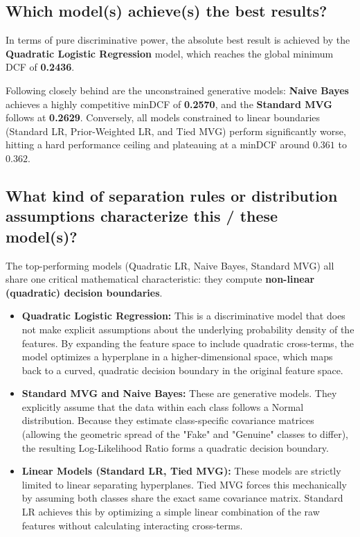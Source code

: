 \subsection*{Which model(s) achieve(s) the best results?}

In terms of pure discriminative power, the absolute best result is achieved by the \textbf{Quadratic Logistic Regression} model, which reaches the global minimum DCF of \textbf{0.2436}. 

Following closely behind are the unconstrained generative models: \textbf{Naive Bayes} achieves a highly competitive minDCF of \textbf{0.2570}, and the \textbf{Standard MVG} follows at \textbf{0.2629}. Conversely, all models constrained to linear boundaries (Standard LR, Prior-Weighted LR, and Tied MVG) perform significantly worse, hitting a hard performance ceiling and plateauing at a minDCF around $0.361$ to $0.362$.

\subsection*{What kind of separation rules or distribution assumptions characterize this / these model(s)?}

The top-performing models (Quadratic LR, Naive Bayes, Standard MVG) all share one critical mathematical characteristic: they compute \textbf{non-linear (quadratic) decision boundaries}. 
\begin{itemize}
    \item \textbf{Quadratic Logistic Regression:} This is a discriminative model that does not make explicit assumptions about the underlying probability density of the features. By expanding the feature space to include quadratic cross-terms, the model optimizes a hyperplane in a higher-dimensional space, which maps back to a curved, quadratic decision boundary in the original feature space.
    \item \textbf{Standard MVG and Naive Bayes:} These are generative models. They explicitly assume that the data within each class follows a Normal distribution. Because they estimate class-specific covariance matrices (allowing the geometric spread of the "Fake" and "Genuine" classes to differ), the resulting Log-Likelihood Ratio forms a quadratic decision boundary.
    \item \textbf{Linear Models (Standard LR, Tied MVG):} These models are strictly limited to linear separating hyperplanes. Tied MVG forces this mechanically by assuming both classes share the exact same covariance matrix. Standard LR achieves this by optimizing a simple linear combination of the raw features without calculating interacting cross-terms.
\end{itemize}

